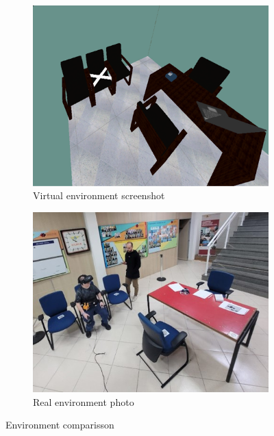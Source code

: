         \begin{figure}[!htb]
            \centering
            \begin{subfigure}[b]{0.49\textwidth}
                \centering
                \includegraphics[width=\textwidth]{Metodologia/VE.png}
                \caption{Virtual environment screenshot}
                \label{fig:ve_photo}
            \end{subfigure}
            \hfill
            \begin{subfigure}[b]{0.49\textwidth}
                \centering
                \includegraphics[width=\textwidth]{Metodologia/RE.jpg}
                \caption{Real environment photo}
                \label{fig:re_photo}
            \end{subfigure}
               \caption{Environment comparisson}
               \label{fig:ve_re}
        \end{figure}


